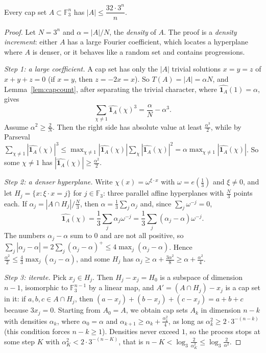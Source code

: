 \begin{theorem}[Meshulam, 1995]\label{thm:meshulam}
Every cap set $A\subset\mathbb F_3^n$ has $|A|\le\dfrac{32\cdot3^n}n$.
\end{theorem}
\begin{proof}
Let $N=3^n$ and $\alpha=|A|/N$, the \emph{density} of $A$. The proof is a \emph{density increment}: either $A$ has a large Fourier coefficient,
which locates a hyperplane where $A$ is denser, or it behaves like a random set and contains progressions.

\emph{Step 1: a large coefficient.} A cap set has only the $|A|$ trivial solutions $x=y=z$ of $x+y+z=0$ (if $x=y$, then $z=-2x=x$). So
$T(A)=|A|=\alpha N$, and Lemma~\ref{lem:capcount}, after separating the trivial character, where $\widehat{\mathbf 1_A}(1)=\alpha$, gives
\[\sum_{\chi\ne1}\widehat{\mathbf 1_A}(\chi)^3=\frac\alpha N-\alpha^3.\]
Assume $\alpha^2\ge\frac2N$. Then the right side has absolute value at least $\frac{\alpha^3}2$, while by Parseval
$\sum_{\chi\ne1}|\widehat{\mathbf 1_A}(\chi)|^3\le\max_{\chi\ne1}|\widehat{\mathbf 1_A}(\chi)|\sum_\chi|\widehat{\mathbf 1_A}(\chi)|^2=\alpha\max_{\chi\ne1}|\widehat{\mathbf 1_A}(\chi)|$.
So some $\chi\ne1$ has $|\widehat{\mathbf 1_A}(\chi)|\ge\frac{\alpha^2}2$.

\emph{Step 2: a denser hyperplane.} Write $\chi(x)=\omega^{\xi\cdot x}$ with $\omega=e(\frac13)$ and $\xi\ne0$, and let $H_j=\{x:\xi\cdot x=j\}$ for
$j\in\mathbb F_3$: three parallel affine hyperplanes with $\frac N3$ points each. If $\alpha_j=|A\cap H_j|/\frac N3$, then $\alpha=\frac13\sum_j\alpha_j$ and,
since $\sum_j\omega^{-j}=0$,
\[\widehat{\mathbf 1_A}(\chi)=\frac13\sum_j\alpha_j\omega^{-j}=\frac13\sum_j(\alpha_j-\alpha)\omega^{-j}.\]
The numbers $\alpha_j-\alpha$ sum to $0$ and are not all positive, so $\sum_j|\alpha_j-\alpha|=2\sum_j(\alpha_j-\alpha)^+\le4\max_j(\alpha_j-\alpha)$. Hence
$\frac{\alpha^2}2\le\frac43\max_j(\alpha_j-\alpha)$, and some $H_j$ has $\alpha_j\ge\alpha+\frac{3\alpha^2}8\ge\alpha+\frac{\alpha^2}4$.

\emph{Step 3: iterate.} Pick $x_j\in H_j$. Then $H_j-x_j=H_0$ is a subspace of dimension $n-1$, isomorphic to $\mathbb F_3^{n-1}$ by a linear map,
and $A'=(A\cap H_j)-x_j$ is a cap set in it: if $a,b,c\in A\cap H_j$, then $(a-x_j)+(b-x_j)+(c-x_j)=a+b+c$ because $3x_j=0$. Starting from $A_0=A$, we obtain
cap sets $A_k$ in dimension $n-k$ with densities $\alpha_k$, where $\alpha_0=\alpha$ and $\alpha_{k+1}\ge\alpha_k+\frac{\alpha_k^2}4$, as long as
$\alpha_k^2\ge2\cdot3^{-(n-k)}$ (this condition forces $n-k\ge1$). Densities never exceed $1$, so the process stops at some step $K$ with
$\alpha_K^2<2\cdot3^{-(n-K)}$, that is $n-K<\log_3\frac2{\alpha_K^2}\le\log_3\frac2{\alpha^2}$.


\end{proof}

